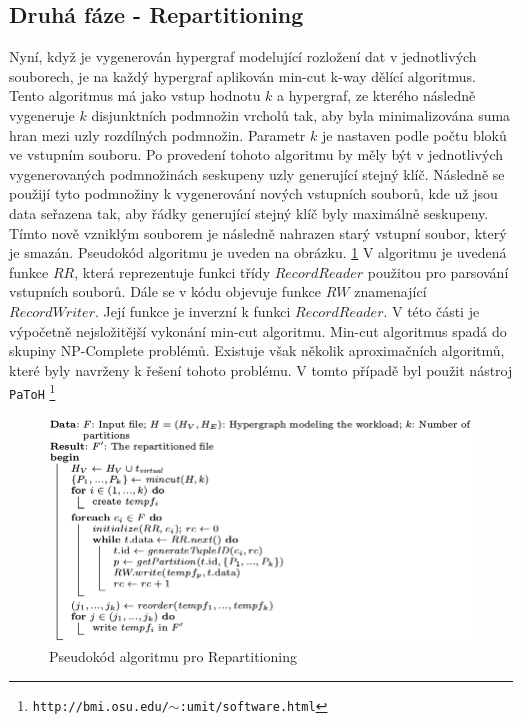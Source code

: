 \documentclass[thesis=M,czech]{FITthesis}[2012/06/26]
\begin{document}
\subsection{Druhá fáze - Repartitioning}
Nyní, když je vygenerován hypergraf modelující rozložení dat v jednotlivých souborech, je na každý hypergraf aplikován min-cut k-way dělící algoritmus. Tento algoritmus má jako vstup hodnotu $k$ a hypergraf, ze kterého následně vygeneruje $k$ disjunktních podmnožin vrcholů tak, aby byla minimalizována suma hran mezi uzly rozdílných podmnožin. Parametr $k$ je nastaven podle počtu bloků ve vstupním souboru. Po provedení tohoto algoritmu by měly být v jednotlivých vygenerovaných podmnožinách seskupeny uzly generující stejný klíč. Následně se použijí tyto podmnožiny k vygenerování nových vstupních souborů, kde už jsou data seřazena tak, aby řádky generující stejný klíč byly maximálně seskupeny. Tímto nově vzniklým souborem je následně nahrazen starý vstupní soubor, který je smazán. Pseudokód algoritmu je uveden na obrázku. \ref{fig:alg2} V algoritmu je uvedená funkce $RR$, která reprezentuje funkci třídy $RecordReader$  použitou pro parsování vstupních souborů. Dále se v kódu objevuje funkce $RW$ znamenající $RecordWriter$. Její funkce je inverzní k funkci $RecordReader$. V této části je výpočetně nejsložitější vykonání min-cut algoritmu. Min-cut algoritmus spadá do skupiny NP-Complete problémů. Existuje však několik aproximačních algoritmů, které byly navrženy k řešení tohoto problému. V tomto případě byl použit nástroj \texttt{PaToH} \footnote{\texttt{http://bmi.osu.edu/$\sim$:umit/software.html}}

\begin{figure}\centering
	\includegraphics[width=1\textwidth, angle=0]{files/alg2}
	\caption[Pseudokód algoritmu pro Repartitioning]
	{Pseudokód algoritmu pro Repartitioning}\label{fig:alg2}
\end{figure} 
\end{document}

